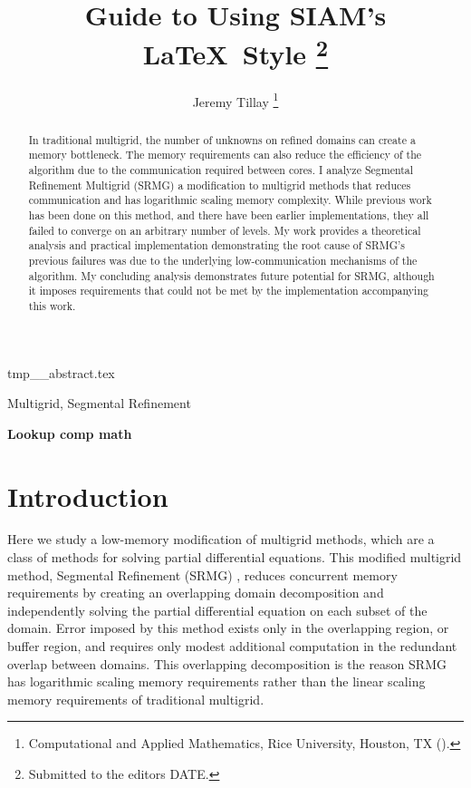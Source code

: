 \documentclass[final]{siamart1116}
\title{Guide to Using SIAM's \LaTeX\ Style%
  \thanks{Submitted to the editors DATE.
\funding{Funding information goes here.}}}
\author{Jeremy Tillay%
  \thanks{Computational and Applied Mathematics, Rice University, Houston, TX (\email{jrt5493@gmail.com}).}%
}
\numberwithin{theorem}{section}
\begin{document}


\begin{tcbverbatimwrite}{tmp_\jobname_abstract.tex}
\begin{abstract}
	In traditional multigrid, the number of unknowns on refined domains can create a memory bottleneck. The memory requirements can also reduce the efficiency of the algorithm due to the communication required between cores. I analyze Segmental Refinement Multigrid (SRMG) a modification to multigrid methods that reduces communication and has logarithmic scaling memory complexity. While previous work has been done on this method, and there have been earlier implementations, they all failed to converge on an arbitrary number of levels. My work provides a theoretical analysis and practical implementation demonstrating the root cause of SRMG's previous failures was due to the underlying low-communication mechanisms of the algorithm. My concluding analysis demonstrates future potential for SRMG, although it imposes requirements that could not be met by the implementation accompanying this work. 
\end{abstract}

\begin{keywords}
 Multigrid, Segmental Refinement
\end{keywords}

\begin{AMS}
 \textbf{Lookup comp math}
\end{AMS}
\end{tcbverbatimwrite}


\section{Introduction}\label{sec:intro}
  
  Here we study a low-memory modification of multigrid methods, which are a class of methods for
solving partial differential equations. This modified multigrid method, Segmental Refinement (SRMG) \cite{brandt1994multigrid}, reduces concurrent memory requirements by creating an overlapping domain decomposition and independently solving the partial differential equation on each subset of the domain. Error imposed by this method exists only in the overlapping region, or buffer region, and requires only modest additional computation in the redundant overlap between domains. This overlapping decomposition is the reason SRMG has logarithmic scaling memory requirements rather than the linear scaling memory requirements of traditional multigrid.
    
\end{document}
